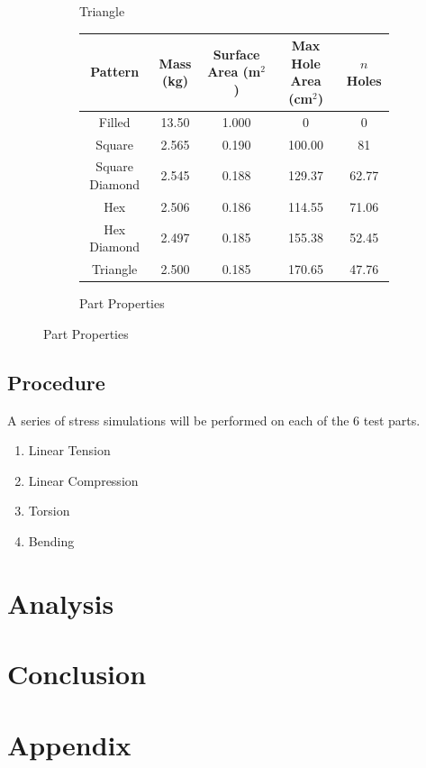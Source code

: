 \documentclass[12pt, letterpaper]{article}
\begin{document}
\begin{figure}[H]
\begin{subfigure}[b]{.3\linewidth}
		\caption{Triangle}
	\end{subfigure}
	\begin{subfigure}[b]{\linewidth}
	\begingroup
	\setlength{\tabcolsep}{10pt} %
	\renewcommand{\arraystretch}{1.5} %
		\begin{tabular}{ | c | c | c | c | c | }\hline
			Pattern 			& Mass (kg) 	& Surface Area (m$^2$)	& Max Hole Area (cm$^2$) 	& $n$ Holes 	\\\hline
			Filled				& 13.50 		& 1.000 						& 0			 					& 0			\\\hline
			Square			& 2.565 		& 0.190 						& 100.00		 					& 81			\\\hline
			Square Diamond	& 2.545 		& 0.188 						& 129.37	 						& 62.77		\\\hline
			Hex				& 2.506 		& 0.186 						& 114.55	 						& 71.06		\\\hline
			Hex Diamond		& 2.497 		& 0.185 						& 155.38	 						& 52.45		\\\hline
			Triangle			& 2.500 		& 0.185						& 170.65				 			& 47.76		\\\hline
		\end{tabular}
		\caption{Part Properties}
	\endgroup
	\end{subfigure}
\end{figure}

\subsection{Procedure}

A series of stress simulations will be performed on each of the 6 test parts. 

\begin{enumerate}
\item Linear Tension
\item Linear Compression
\item Torsion
\item Bending
\end{enumerate}

\section{Analysis}

\section{Conclusion}

\newpage
\printbibliography{}

\newpage
\section{Appendix}
\listoffigures{}
\end{document}

